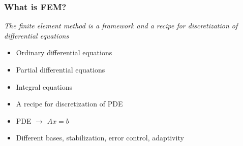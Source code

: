 \begin{frame}
  \frametitle{What is FEM?}

  \emph{The finite element method is a framework and a recipe for
    discretization of differential equations}

  \begin{itemize}
  \item
    Ordinary differential equations
  \item
    Partial differential equations
  \item
    Integral equations
  \end{itemize}

  \begin{itemize}
  \item
    A recipe for discretization of PDE
  \item
    PDE $\rightarrow$ $Ax = b$
  \item
    Different bases, stabilization, error control, adaptivity
  \end{itemize}

\end{frame}
